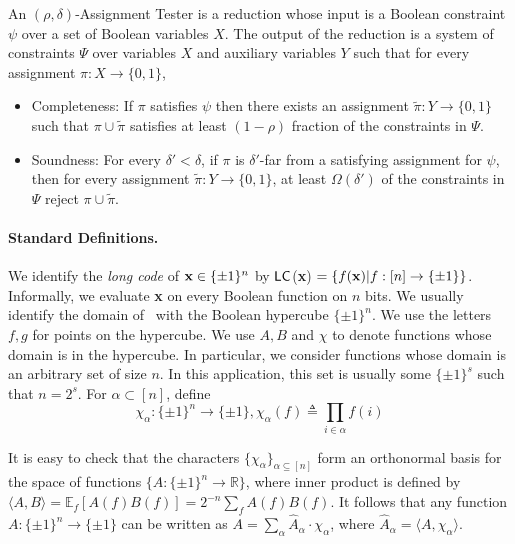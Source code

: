 \begin{definition} \label{AT} An $(\rho,
  \delta)$-Assignment Tester is a reduction whose input is a Boolean
  constraint $\psi$ over a set of Boolean variables $X$. The output of
  the reduction is a system of constraints $\Psi$ over variables $X$
  and auxiliary variables $Y$ such that for every assignment $\pi: X
  \rightarrow \{0,1\}$,
\begin{itemize}
\item {\sf Completeness:} If $\pi$ satisfies $\psi$ then there exists
  an assignment $\tilde{\pi} : Y \rightarrow \{0,1\}$ such that $\pi
  \cup \tilde{\pi}$ satisfies at least $( 1 - \rho)$ fraction of
  the constraints in $\Psi$.
\item {\sf Soundness:} For every $\delta' < \delta$, if $\pi$ is
  $\delta'$-far from a satisfying assignment for $\psi$, then for
  every assignment $\tilde{\pi}: Y \rightarrow \{0,1\}$, at least
  $\Omega(\delta')$ of the constraints in $\Psi$ reject $\pi \cup
  \tilde{\pi}$.
\end{itemize}
\end{definition}


\paragraph{Standard Definitions.} We identify the {\em long code} of
${\bf x} \in \{\pm 1\}^n$ by ${\sf LC}$({\bf x}) $= \{ f({\bf x}) | f : [n]
\rightarrow \{\pm 1\} \}$. Informally, we evaluate {\bf x} on every
Boolean function on $n$ bits. We usually identify the domain of \LC \
with the Boolean hypercube $\{\pm 1\}^n$. We use the letters $f, g$
for points on the hypercube. We use $A, B$ and $\chi$ to denote
functions whose domain is in the hypercube. In particular, we consider
functions whose domain is an arbitrary set of size $n$. In this
application, this set is usually some $\{\pm 1\}^s$ such that $n =
2^s$.  For $\alpha \subset [n]$, define
\[
          \chi_\alpha : \{\pm 1\}^n \rightarrow \{\pm 1\},  \chi_\alpha(f) \triangleq \prod_{i\in \alpha}f(i)
\]

It is easy to check that the characters $\{\chi_\alpha\}_{\alpha
  \subseteq [n]}$ form an orthonormal basis for the space of functions
$\{A : \{\pm 1\}^n \rightarrow \mathbb{R}\}$, where inner product is
defined by $\langle A, B \rangle = \mathbb{E}_f[A(f) B(f)] =
2^{-n}\sum_fA(f)B(f)$. It follows that any function $A: \{\pm 1\}^n
\rightarrow \{\pm 1\}$ can be written as $A = \sum_\alpha
\hat{A}_\alpha \cdot \chi_\alpha$, where $\hat{A}_\alpha =\langle
A,\chi_\alpha \rangle$. 

